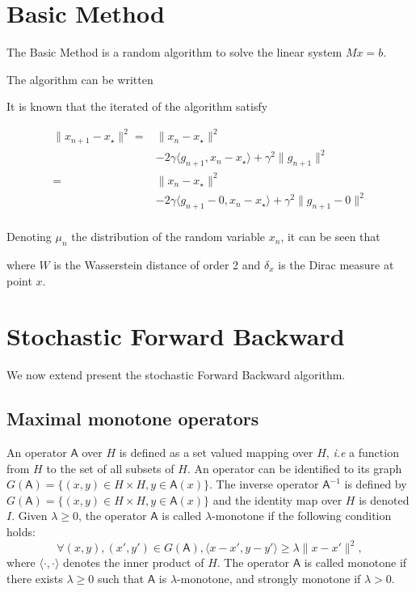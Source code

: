 \documentclass{article}
\newcommand{\1}{\mathbbm 1}
\newcommand{\sA}{{\mathsf A}}
\newcommand{\ps}[1]{\langle #1 \rangle}
\newcommand{\asnote}[1]{\todo[color=green!20]{#1}}
\theoremstyle{definition}
\begin{document}
\section{Basic Method}

The Basic Method is a random algorithm to solve the linear system $M x = b$. 

The algorithm can be written

It is known that the iterated of the algorithm satisfy

\begin{align*}
    \|x_{n+1} - x_\star\|^2 =& \|x_{n} - x_\star\|^2 \\
    &- 2\gamma\ps{g_{n+1},x_n - x_\star} + \gamma^2\|g_{n+1}\|^2\\
    =& \|x_{n} - x_\star\|^2 \\
    &- 2\gamma\ps{g_{n+1} - 0,x_n - x_\star} + \gamma^2\|g_{n+1} - 0\|^2\\
\end{align*}

Denoting $\mu_n$ the distribution of the random variable $x_n$, it can be seen that\asnote{to complete}

where $W$ is the Wasserstein distance of order 2 and $\delta_x$ is the Dirac measure at point $x$.

\section{Stochastic Forward Backward}

We now extend present the stochastic Forward Backward algorithm. 

\subsection{Maximal monotone operators}
An operator $\sA$ over $H$ is defined as a set valued mapping over $H$, \textit{i.e} a function from $H$ to the set of all subsets of $H$. An operator can be identified to its graph $G(\sA) = \{(x,y) \in H \times H, y \in \sA(x)\}$. The inverse operator $\sA^{-1}$ is defined by $G(\sA) = \{(x,y) \in H \times H, y \in \sA(x)\}$ and the identity map over $H$ is denoted $I$. Given $\lambda \geq 0$, the operator $\sA$ is called $\lambda$-monotone if the following condition holds: 
\begin{equation}
\forall (x,y),(x',y') \in G(\sA), \ps{x-x',y-y'} \geq \lambda \|x-x'\|^2,
\end{equation}
where $\ps{\cdot,\cdot}$ denotes the inner product of $H$. The operator $\sA$ is called monotone if there exists $\lambda \geq 0$ such that $\sA$ is $\lambda$-monotone, and strongly monotone if $\lambda > 0$.
\end{document}
